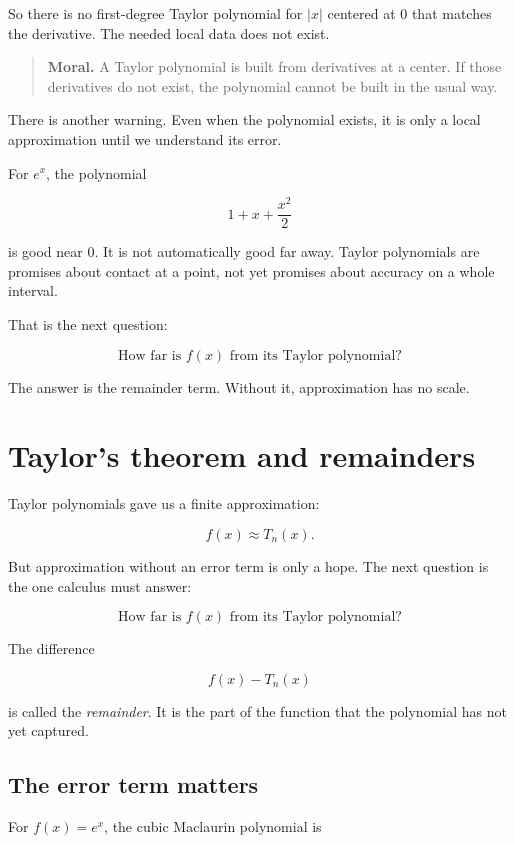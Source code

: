 So there is no first-degree Taylor polynomial for \(|x|\) centered at \(0\) that matches
the derivative.  The needed local data does not exist.

\begin{quote}
\textbf{Moral.}
A Taylor polynomial is built from derivatives at a center.  If those derivatives do not
exist, the polynomial cannot be built in the usual way.
\end{quote}

There is another warning.  Even when the polynomial exists, it is only a local
approximation until we understand its error.

For \(e^x\), the polynomial

\[
1+x+\frac{x^2}{2}
\]

is good near \(0\).  It is not automatically good far away.  Taylor polynomials are
promises about contact at a point, not yet promises about accuracy on a whole interval.

That is the next question:

\[
\boxed{
\text{How far is \(f(x)\) from its Taylor polynomial?}
}
\]

The answer is the remainder term.  Without it, approximation has no scale.

\section{Taylor's theorem and remainders}
\label{sec:taylor-theorem-remainders}

Taylor polynomials gave us a finite approximation:

\[
f(x)\approx T_n(x).
\]

But approximation without an error term is only a hope.  The next question is the one
calculus must answer:

\[
\boxed{
\text{How far is \(f(x)\) from its Taylor polynomial?}
}
\]

The difference

\[
f(x)-T_n(x)
\]

is called the \emph{remainder}.  It is the part of the function that the polynomial has
not yet captured.

\subsection{The error term matters}
\label{subsec:error-term-matters}

For \(f(x)=e^x\), the cubic Maclaurin polynomial is

